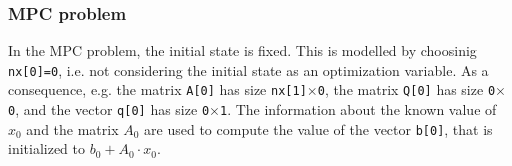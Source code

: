 \documentclass{report}
\begin{document}
\subsubsection{MPC problem}

In the MPC problem, the initial state is fixed.
This is modelled by choosinig {\tt nx[0]=0}, i.e. not considering the initial state as an optimization variable.
As a consequence, e.g. the matrix {\tt A[0]} has size {\tt nx[1]$\times$0}, the matrix {\tt Q[0]} has size {\tt 0$\times$0}, and the vector {\tt q[0]} has size {\tt 0$\times$1}.
The information about the known value of $x_0$ and the matrix $A_0$ are used to compute the value of the vector {\tt b[0]}, that is initialized to $b_0 + A_0 \cdot x_0$.
\end{document}
